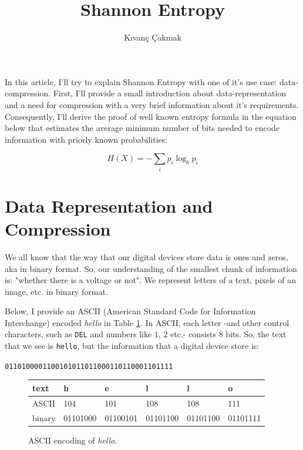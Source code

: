 \documentclass[11pt]{article}
\title{\textbf{Shannon Entropy}}
\author{K{\i}van\c{c} \c{C}akmak\\}
\date{}
\begin{document}
\maketitle

In this article, I'll try to explain Shannon Entropy with one of it's use case: data-compression. First, I'll provide a small introduction about data-representation and a need for compression with a very brief information about it's requirements. Consequently, I'll derive the proof of well known entropy formula in the equation below that estimates the average minimum number of bits needed to encode information with priorly known probabilities:

\begin{equation}
H(X) = -\sum_{i}p_{i}\log_{b}p_{i}
\label{Eq:entropy}
\end{equation}

\section{Data Representation and Compression}

We all know that the way that our digital devices store data is ones and zeros, aka in binary format. So, our understanding of the smallest chunk of information is: "whether there is a voltage or not". 
We represent letters of a text, pixels of an image, etc. in binary format. 

Below, I provide an ASCII (American Standard Code for Information Interchange) encoded \textit{hello} in Table \ref{table:hello}. In ASCII, each letter -and other control characters, such as \texttt{DEL} and numbers like $1$, $2$ etc.- consists $8$ bits. So, the text that we see is \texttt{hello}, but the information that a digital device store is: 
\begin{center}
    \texttt{0110100001100101011011000110110001101111}
\end{center}

\begin{figure}
\begin{tabular}{| l | l | l | l | l | l |}
 \hline
  text   & h & e & l & l & o\\ \hline
  ASCII  & 104 & 101 & 108 & 108 & 111 \\ \hline 
  binary & 01101000 & 01100101 & 01101100 & 01101100 & 01101111 \\ 
  \hline
\end{tabular}
\caption{ASCII encoding of \textit{hello}.}
\label{table:hello}
\end{figure}
\end{document}
